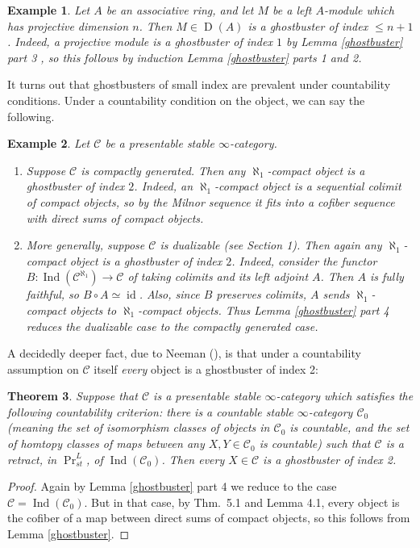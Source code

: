 \documentclass[12pt]{article}
\newtheorem{theorem}{Theorem}[section]
\newtheorem{example}[theorem]{Example}
\newcommand{\on}{\operatorname}
\begin{document}
\begin{example}
Let $A$ be an associative ring, and let $M$ be a left $A$-module which has projective dimension $n$.  Then $M\in\on{D}(A)$ is a ghostbuster of index $\leq n+1$.  Indeed, a projective module is a ghostbuster of index $1$ by Lemma \ref{ghostbuster} part 3 , so this follows by induction Lemma \ref{ghostbuster} parts 1 and 2.
\end{example}

It turns out that ghostbusters of small index are prevalent under countability conditions.  Under a countability condition on the object, we can say the following.

\begin{example}
Let $\mathcal{C}$ be a presentable stable $\infty$-category.
\begin{enumerate}
\item Suppose $\mathcal{C}$ is compactly generated.  Then any $\aleph_1$-compact object is a ghostbuster of index $2$.  Indeed, an $\aleph_1$-compact object is a sequential colimit of compact objects, so by the Milnor sequence it fits into a cofiber sequence with direct sums of compact objects.
\item More generally, suppose $\mathcal{C}$ is dualizable (see \cite{EfimovKtheory} Section 1). Then again any $\aleph_1$-compact object is a ghostbuster of index $2$.  Indeed, consider the functor $B:\on{Ind}(\mathcal{C}^{\aleph_1})\to\mathcal{C}$ of taking colimits and its left adjoint $A$.  Then $A$ is fully faithful, so $B\circ A\simeq \on{id}$.  Also, since $B$ preserves colimits, $A$ sends $\aleph_1$-compact objects to $\aleph_1$-compact objects.  Thus Lemma \ref{ghostbuster} part 4 reduces the dualizable case to the compactly generated case.
\end{enumerate}
\end{example}

A decidedly deeper fact, due to Neeman (\cite{NeemanPhantom}), is that under a countability assumption on $\mathcal{C}$ itself \emph{every} object is a ghostbuster of index 2:

\begin{theorem}\label{countablephantom}
Suppose that $\mathcal{C}$ is a presentable stable $\infty$-category which satisfies the following countability criterion: there is a countable stable $\infty$-category $\mathcal{C}_0$ (meaning the set of isomorphism classes of objects in $\mathcal{C}_0$ is countable, and the set of homtopy classes of maps between any $X,Y\in\mathcal{C}_0$ is countable) such that $\mathcal{C}$ is a retract, in $\on{Pr}^L_{st}$, of $\on{Ind}(\mathcal{C}_0)$.  Then every $X\in\mathcal{C}$ is a ghostbuster of index 2.
\end{theorem}
\begin{proof}
Again by Lemma \ref{ghostbuster} part 4 we reduce to the case $\mathcal{C}=\on{Ind}(\mathcal{C}_0)$.  But in that case, by \cite{NeemanPhantom} Thm.\ 5.1 and Lemma 4.1, every object is the cofiber of a map between direct sums of compact objects, so this follows from Lemma \ref{ghostbuster}.
\end{proof}
\end{document}
